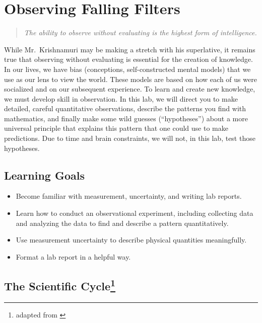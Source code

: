 \chapter{Observing Falling Filters}

	\begin{quotation}
		\textit{The ability to observe without evaluating is the highest form of intelligence.} 
	\end{quotation}

While Mr.\ Krishnamuri may be making a stretch with his superlative, it remains true that observing without evaluating is essential for the creation of knowledge.
In our lives, we have bias (conceptions, self-constructed mental models) that we use as our lens to view the world.
These models are based on how each of us were socialized and on our subsequent experience.
To learn and create new knowledge, we must develop skill in observation.
In this lab, we will direct you to make detailed, careful quantitative observations, describe the patterns you find with mathematics, and finally make some wild guesses (``hypotheses'') about a more universal principle that explains this pattern that one could use to make predictions.
Due to time and brain constraints, we will not, in this lab, test those hypotheses.

\section*{Learning Goals}

 \begin{itemize}

  \item Become familiar with measurement, uncertainty, and writing lab reports.

  \item Learn how to conduct an observational experiment, including collecting data and analyzing the data to find and describe a pattern quantitatively.

  \item Use measurement uncertainty to describe physical quantities meaningfully.
  
  \item Format a lab report in a helpful way.
 \end{itemize}

\section*{The Scientific Cycle\protect\footnote{adapted from \cite{etkina_college_2014}}}


